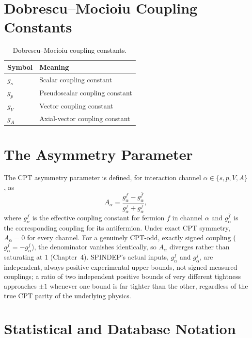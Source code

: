 \section{Dobrescu--Mocioiu Coupling Constants}

\begin{table}[h]
\centering
\begin{tabular}{@{}ll@{}}
\toprule
Symbol & Meaning \\
\midrule
$g_s$ & Scalar coupling constant \\
$g_p$ & Pseudoscalar coupling constant \\
$g_V$ & Vector coupling constant \\
$g_A$ & Axial-vector coupling constant \\
\bottomrule
\end{tabular}
\caption{Dobrescu--Mocioiu coupling constants.}
\label{tab:app-dm-couplings}
\end{table}

\section{The Asymmetry Parameter}
\label{app:asymmetry}

The CPT asymmetry parameter is defined, for interaction channel
$\alpha\in\{s,p,V,A\}$, as
\begin{equation}
  A_\alpha = \frac{g_\alpha^f-g_\alpha^{\bar f}}{g_\alpha^f+g_\alpha^{\bar f}},
\end{equation}
where $g_\alpha^f$ is the effective coupling constant for fermion $f$ in
channel $\alpha$ and $g_\alpha^{\bar f}$ is the corresponding coupling for
its antifermion. Under exact CPT symmetry, $A_\alpha=0$ for every channel.
For a genuinely CPT-odd, exactly signed coupling
($g_\alpha^{\bar f}=-g_\alpha^f$), the denominator vanishes identically, so
$A_\alpha$ diverges rather than saturating at $1$ (Chapter~4). SPINDEP's
actual inputs, $g_\alpha^f$ and $g_\alpha^{\bar f}$, are independent,
always-positive experimental upper bounds, not signed measured couplings; a
ratio of two independent positive bounds of very different tightness
approaches $\pm1$ whenever one bound is far tighter than the other,
regardless of the true CPT parity of the underlying physics.

\section{Statistical and Database Notation}

